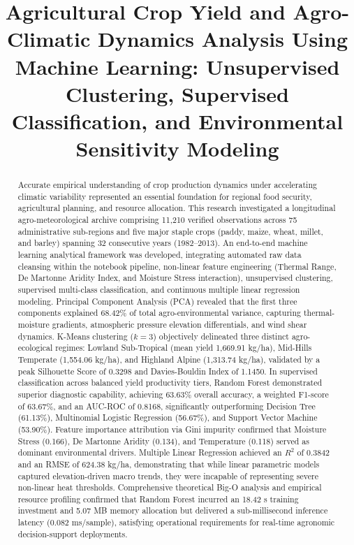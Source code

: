 \documentclass[conference]{IEEEtran}
\title{Agricultural Crop Yield and Agro-Climatic Dynamics Analysis Using Machine Learning: Unsupervised Clustering, Supervised Classification, and Environmental Sensitivity Modeling}
\author{
\IEEEauthorblockN{Sukriti Sapkota}
\IEEEauthorblockA{
MSc Data Science and Computational Intelligence\\
Softwarica College of IT and E-Commerce, Coventry University\\
Student ID: 260180 \quad Module: STW7072CEM Machine Learning\\
Email: 260180@softwarica.edu.np
}
}
\begin{document}
\maketitle

\begin{abstract}
Accurate empirical understanding of crop production dynamics under accelerating climatic variability represented an essential foundation for regional food security, agricultural planning, and resource allocation. This research investigated a longitudinal agro-meteorological archive comprising 11,210 verified observations across 75 administrative sub-regions and five major staple crops (paddy, maize, wheat, millet, and barley) spanning 32 consecutive years (1982--2013). An end-to-end machine learning analytical framework was developed, integrating automated raw data cleansing within the notebook pipeline, non-linear feature engineering (Thermal Range, De Martonne Aridity Index, and Moisture Stress interaction), unsupervised clustering, supervised multi-class classification, and continuous multiple linear regression modeling. Principal Component Analysis (PCA) revealed that the first three components explained 68.42\% of total agro-environmental variance, capturing thermal-moisture gradients, atmospheric pressure elevation differentials, and wind shear dynamics. K-Means clustering ($k=3$) objectively delineated three distinct agro-ecological regimes: Lowland Sub-Tropical (mean yield 1,669.91 kg/ha), Mid-Hills Temperate (1,554.06 kg/ha), and Highland Alpine (1,313.74 kg/ha), validated by a peak Silhouette Score of 0.3298 and Davies-Bouldin Index of 1.1450. In supervised classification across balanced yield productivity tiers, Random Forest demonstrated superior diagnostic capability, achieving 63.63\% overall accuracy, a weighted F1-score of 63.67\%, and an AUC-ROC of 0.8168, significantly outperforming Decision Tree (61.13\%), Multinomial Logistic Regression (56.67\%), and Support Vector Machine (53.90\%). Feature importance attribution via Gini impurity confirmed that Moisture Stress (0.166), De Martonne Aridity (0.134), and Temperature (0.118) served as dominant environmental drivers. Multiple Linear Regression achieved an $R^2$ of 0.3842 and an RMSE of 624.38 kg/ha, demonstrating that while linear parametric models captured elevation-driven macro trends, they were incapable of representing severe non-linear heat thresholds. Comprehensive theoretical Big-O analysis and empirical resource profiling confirmed that Random Forest incurred an 18.42 s training investment and 5.07 MB memory allocation but delivered a sub-millisecond inference latency (0.082 ms/sample), satisfying operational requirements for real-time agronomic decision-support deployments.
\end{abstract}
\end{document}
